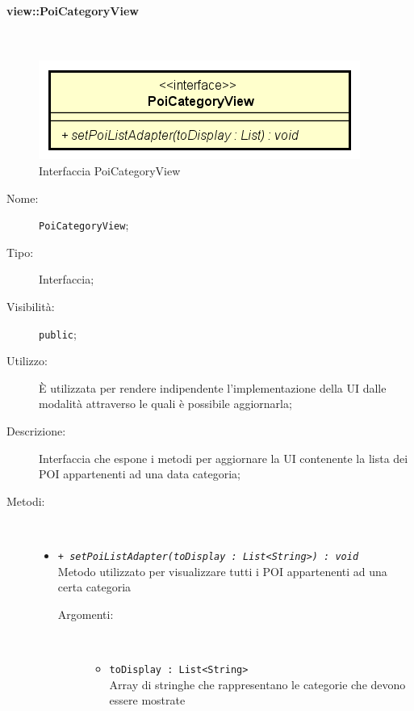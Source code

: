 \documentclass[../DefinizioneDiProdotto.tex]{subfiles}
\begin{document}
\paragraph{view::PoiCategoryView}
\
\begin{figure}[H]
	\centering
	\includegraphics[width=\maxwidth]{img/PoiCategoryView.png}
	\caption{Interfaccia PoiCategoryView}\label{fig:view::PoiCategoryView} 
\end{figure}
\begin{description}
	\item[Nome:] \texttt{PoiCategoryView};
	\item[Tipo:] Interfaccia;
	\item[Visibilità:] \texttt{public};
	\item[Utilizzo:] È utilizzata per rendere indipendente l'implementazione della UI dalle modalità attraverso le quali è possibile aggiornarla;
	\item[Descrizione:] Interfaccia che espone i metodi per aggiornare la UI contenente la lista dei POI appartenenti ad una data categoria;
	\item[Metodi:] \
	\begin{itemize}
		\item \texttt{+ \textit{setPoiListAdapter(toDisplay : List<String>) : void}}\\
		Metodo utilizzato per visualizzare tutti i POI appartenenti ad una certa categoria
		\begin{description}
			\item[Argomenti:] \
			\begin{itemize}
				\item \texttt{toDisplay : List<String>}\\
				Array di stringhe che rappresentano le categorie che devono essere mostrate\end{itemize}
		\end{description}
	\end{itemize}
\end{description}
\end{document}
